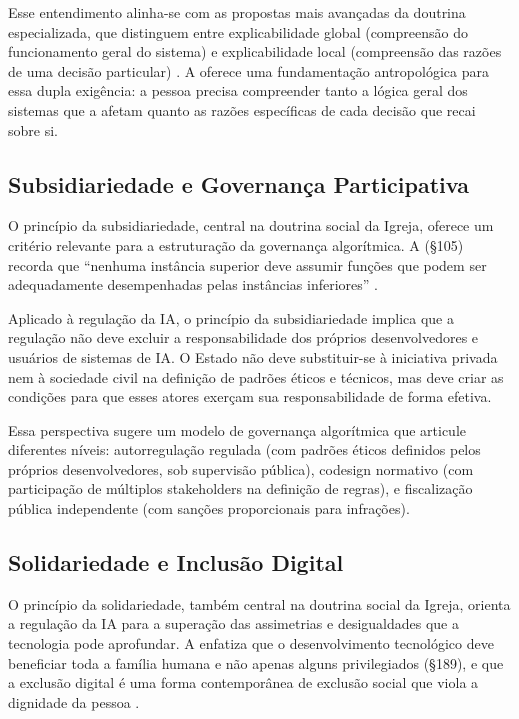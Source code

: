 Esse entendimento alinha-se com as propostas mais avançadas da doutrina especializada, que distinguem entre explicabilidade global (compreensão do funcionamento geral do sistema) e explicabilidade local (compreensão das razões de uma decisão particular) \cite{DoshiVelez2017TMI, Selbst2018INC}. A \MH{} oferece uma fundamentação antropológica para essa dupla exigência: a pessoa precisa compreender tanto a lógica geral dos sistemas que a afetam quanto as razões específicas de cada decisão que recai sobre si.

\subsection{Subsidiariedade e Governança Participativa}
\label{subsec:subsidiariedade-governanca}

O princípio da subsidiariedade, central na doutrina social da Igreja, oferece um critério relevante para a estruturação da governança algorítmica. A \MH{} (§105) recorda que ``nenhuma instância superior deve assumir funções que podem ser adequadamente desempenhadas pelas instâncias inferiores'' \cite{LeaoXIV2026MH}.

Aplicado à regulação da IA, o princípio da subsidiariedade implica que a regulação não deve excluir a responsabilidade dos próprios desenvolvedores e usuários de sistemas de IA. O Estado não deve substituir-se à iniciativa privada nem à sociedade civil na definição de padrões éticos e técnicos, mas deve criar as condições para que esses atores exerçam sua responsabilidade de forma efetiva.

Essa perspectiva sugere um modelo de governança algorítmica que articule diferentes níveis: autorregulação regulada (com padrões éticos definidos pelos próprios desenvolvedores, sob supervisão pública), codesign normativo (com participação de múltiplos stakeholders na definição de regras), e fiscalização pública independente (com sanções proporcionais para infrações).

\subsection{Solidariedade e Inclusão Digital}
\label{subsec:solidariedade-inclusao}

O princípio da solidariedade, também central na doutrina social da Igreja, orienta a regulação da IA para a superação das assimetrias e desigualdades que a tecnologia pode aprofundar. A \MH{} enfatiza que o desenvolvimento tecnológico deve beneficiar toda a família humana e não apenas alguns privilegiados (§189), e que a exclusão digital é uma forma contemporânea de exclusão social que viola a dignidade da pessoa \cite{LeaoXIV2026MH}.

